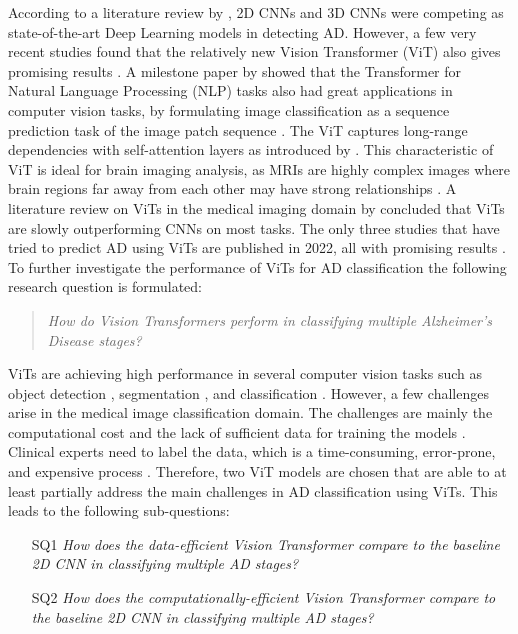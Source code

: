 \documentclass[11pt, a4paper]{article}
\begin{document}
According to a literature review by \cite{Ebrahimighahnavieh2020DeepReview}, 2D CNNs and 3D CNNs were competing as state-of-the-art Deep Learning models in detecting AD. However, a few very recent studies found that the relatively new Vision Transformer (ViT) also gives promising results \citep{Lyu2022ClassificationTransformer,Sarraf2022OViTAD:Data}. A milestone paper by \cite{Dosovitskiy2020AnScale} showed that the Transformer for Natural Language Processing (NLP) tasks also had great applications in computer vision tasks, by formulating image classification as a sequence prediction task of the image patch sequence \citep{He2022TransformersReview}. The ViT captures long-range dependencies with self-attention layers as introduced by \cite{Vaswani2017AttentionNeed}. This characteristic of ViT is ideal for brain imaging analysis, as MRIs are highly complex images where brain regions far away from each other may have strong relationships \citep{Lyu2022ClassificationTransformer}. A literature review on ViTs in the medical imaging domain by \cite{He2022TransformersReview} concluded that ViTs are slowly outperforming CNNs on most tasks. The only three studies that have tried to predict AD using ViTs are published in 2022, all with promising results \citep{Lyu2022ClassificationTransformer,Sarraf2022OViTAD:Data,Yin2022SMIL-DeiT:MultipleClassification}. To further investigate the performance of ViTs for AD classification the following research question is formulated: 

\begin{quote}
\centering
\emph{How do Vision Transformers perform in classifying multiple Alzheimer’s Disease stages?}
\end{quote}

\noindent ViTs are achieving high performance in several computer vision tasks such as object detection \citep{Fang2021YouDetection}, segmentation \citep{Ye2019Cross-modalSegmentation}, and classification \citep{Dosovitskiy2020AnScale}. However, a few challenges arise in the medical image classification domain. The challenges are mainly the computational cost and the lack of sufficient data for training the models \citep{He2022TransformersReview}. Clinical experts need to label the data, which is a time-consuming, error-prone, and expensive process \citep{Alzubaidi2021NovelData}. Therefore, two ViT models are chosen that are able to at least partially address the main challenges in AD classification using ViTs. This leads to the following sub-questions:

\begin{itemize}
\centering
    \item[SQ1] \emph{How does the data-efficient Vision Transformer compare to the baseline 2D CNN in classifying multiple AD stages?}
    \item[SQ2] \emph{How does the computationally-efficient Vision Transformer compare to the baseline 2D CNN in classifying multiple AD stages?}
\end{itemize}
\end{document}
